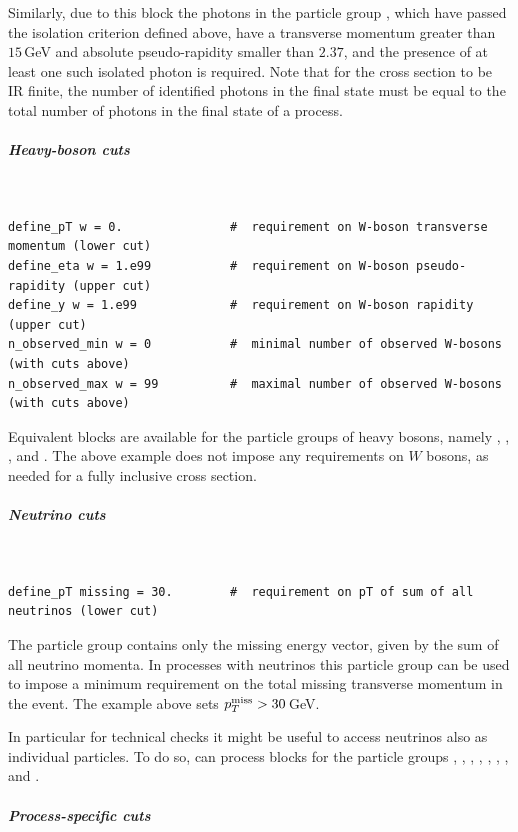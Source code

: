 \documentclass[english,11pt]{article}
\begin{document}
Similarly, due to this block the photons in the particle group , 
which have passed the isolation criterion defined above, have a transverse momentum greater 
than $15$\,GeV and absolute pseudo-rapidity smaller than $2.37$, and the presence of 
at least one such isolated photon is required. Note that for the cross section to 
be IR finite, the number of identified photons in the final state must be equal to 
the total number of photons in the final state of a process.

\subparagraph{Heavy-boson cuts}\quad
{\tt
\begin{lstlisting}
define_pT w = 0.               #  requirement on W-boson transverse momentum (lower cut)
define_eta w = 1.e99           #  requirement on W-boson pseudo-rapidity (upper cut)
define_y w = 1.e99             #  requirement on W-boson rapidity (upper cut)
n_observed_min w = 0           #  minimal number of observed W-bosons (with cuts above)
n_observed_max w = 99          #  maximal number of observed W-bosons (with cuts above)
\end{lstlisting}
}
Equivalent blocks are available for the particle groups of 
heavy bosons, namely , , ,  and . The above example does not impose any requirements on $W$ bosons, 
as needed for a fully inclusive cross section.

\subparagraph{Neutrino cuts}\quad
{\tt
\begin{lstlisting}
define_pT missing = 30.        #  requirement on pT of sum of all neutrinos (lower cut)
\end{lstlisting}
}
The particle group  contains only the missing energy vector, given by the sum of all neutrino momenta.
In processes with neutrinos this particle group can be used to impose
a minimum requirement on the total missing transverse momentum in the event. The example above sets $p_T^{\rm miss}>30$\,GeV.


In particular for technical checks it might be useful to access neutrinos also as 
individual particles. To do so, \Matrix{} can process blocks for the particle groups 
,
, , 
, , 
, ,  and .

\subparagraph{Process-specific cuts}\quad
\end{document}
